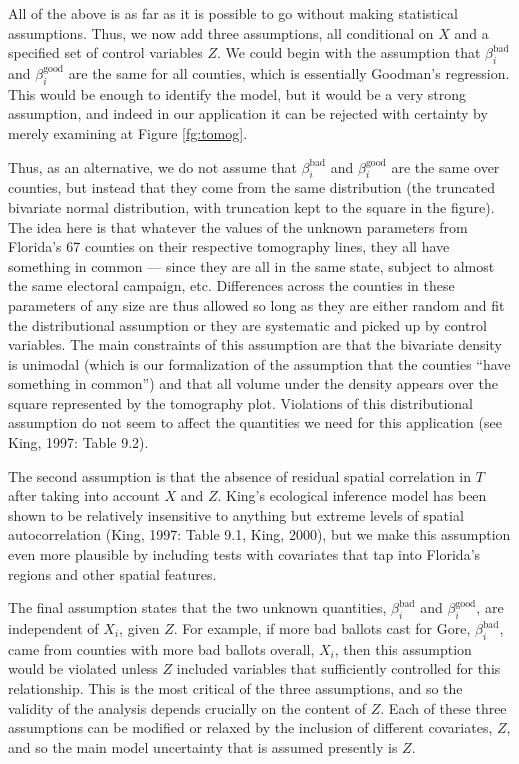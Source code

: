 \documentclass[11pt,titlepage]{article}
\newcommand{\bb}{\beta^{\text{bad}}}
\newcommand{\bg}{\beta^{\text{good}}}
\begin{document}
All of the above is as far as it is possible to go without making
statistical assumptions.  Thus, we now add three assumptions, all
conditional on $X$ and a specified set of control variables $Z$.  We
could begin with the assumption that $\bb_i$ and $\bg_i$ are the same
for all counties, which is essentially Goodman's regression.  This
would be enough to identify the model, but it would be a very strong
assumption, and indeed in our application it can be rejected with
certainty by merely examining at Figure \ref{fg:tomog}.

Thus, as an alternative, we do not assume that $\bb_i$ and $\bg_i$ are
the same over counties, but instead that they come from the same
distribution (the truncated bivariate normal distribution, with
truncation kept to the square in the figure).  The idea here is that
whatever the values of the unknown parameters from Florida's 67
counties on their respective tomography lines, they all have something
in common --- since they are all in the same state, subject to almost
the same electoral campaign, etc.  Differences across the counties in
these parameters of any size are thus allowed so long as they are
either random and fit the distributional assumption or they are
systematic and picked up by control variables.  The main constraints
of this assumption are that the bivariate density is unimodal (which
is our formalization of the assumption that the counties ``have
something in common'') and that all volume under the density appears
over the square represented by the tomography plot.  Violations of
this distributional assumption do not seem to affect the quantities we
need for this application (see King, 1997: Table 9.2).

The second assumption is that the absence of residual spatial
correlation in $T$ after taking into account $X$ and $Z$.  King's
ecological inference model has been shown to be relatively insensitive
to anything but extreme levels of spatial autocorrelation (King, 1997:
Table 9.1, King, 2000)\nocite{King00}, but we make this assumption
even more plausible by including tests with covariates that tap into
Florida's regions and other spatial features.

The final assumption states that the two unknown quantities, $\bb_i$
and $\bg_i$, are independent of $X_i$, given $Z$.  For example, if
more bad ballots cast for Gore, $\bb_i$, came from counties with more
bad ballots overall, $X_i$, then this assumption would be violated
unless $Z$ included variables that sufficiently controlled for this
relationship.  This is the most critical of the three assumptions, and
so the validity of the analysis depends crucially on the content of
$Z$.  Each of these three assumptions can be modified or relaxed by
the inclusion of different covariates, $Z$, and so the main model
uncertainty that is assumed presently is $Z$.
\end{document}
